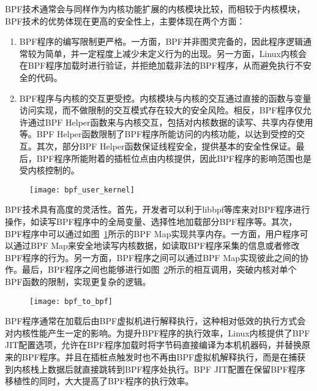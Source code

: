 BPF技术通常会与同样作为内核功能扩展的内核模块比较，而相较于内核模块，BPF技术的优势体现在更高的安全性上，主要体现在两个方面：

\begin{enumerate}
    \item BPF程序的编写限制更严格。一方面，BPF并非图灵完备的，因此程序逻辑通常较为简单，并一定程度上减少未定义行为的出现。另一方面，Linux内核会在BPF程序加载时进行验证，并拒绝加载非法的BPF程序，从而避免执行不安全的代码。
    \item BPF程序与内核的交互更受控。内核模块与内核的交互通过直接的函数与变量访问实现，而不做限制的交互模式存在较大的安全风险。相反，BPF程序仅允许通过BPF Helper函数来与内核交互，包括对内核数据的读写、共享内存使用等。BPF Helper函数限制了BPF程序所能访问的内核功能，以达到受控的交互。其次，部分BPF Helper函数保证线程安全，提供基本的安全性保证。最后，BPF程序所能附着的插桩位点由内核提供，因此BPF程序的影响范围也是受内核控制的。
\end{enumerate}

\begin{figure}[!htbp]
    \centering
    \texttt{[image: bpf\_user\_kernel]}
    \label{fig:bpf_user_kernel}
\end{figure}

BPF技术具有高度的灵活性。首先，开发者可以利于libbpf等库来对BPF程序进行操作，如读写BPF程序中的全局变量、选择性地加载部分BPF程序等。其次，BPF程序中可以通过如图~\ref{fig:bpf_user_kernel}所示的BPF Map实现共享内存。一方面，用户程序可以通过BPF Map来安全地读写内核数据，如读取BPF程序采集的信息或者修改BPF程序的行为。另一方面，BPF程序之间可以通过BPF Map实现彼此之间的协作。最后，BPF程序之间也能够进行如图~\ref{fig:bpf_to_bpf}所示的相互调用，突破内核对单个BPF函数的限制，实现更复杂的逻辑。

\begin{figure}[!htbp]
    \centering
    \texttt{[image: bpf\_to\_bpf]}
    \label{fig:bpf_to_bpf}
\end{figure}

BPF程序通常在加载后由BPF虚拟机进行解释执行，这种相对低效的执行方式会对内核性能产生一定的影响。为提升BPF程序的执行效率，Linux内核提供了BPF JIT配置选项，允许在BPF程序加载时将字节码直接编译为本机机器码，并替换原来的BPF程序。并且在插桩点触发时也不再由BPF虚拟机解释执行，而是在捕获到内核栈上数据后就直接跳转到BPF程序处执行。BPF JIT配置在保留BPF程序移植性的同时，大大提高了BPF程序的执行效率。

